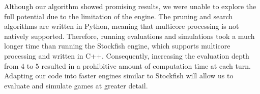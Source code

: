 \documentclass[letterpaper]{article}
\begin{document}
Although our algorithm showed promising results, we were unable to explore the full potential due to the limitation of the engine. The pruning and search algorithms are written in Python, meaning that multicore processing is not natively supported. Therefore, running evaluations and simulations took a much longer time than running the Stockfish engine, which supports multicore processing and written in C++. Consequently, increasing the evaluation depth from 4 to 5 resulted in a prohibitive amount of computation time at each turn. Adapting our code into faster engines similar to Stockfish will allow us to evaluate and simulate games at greater detail. 



\end{document}
